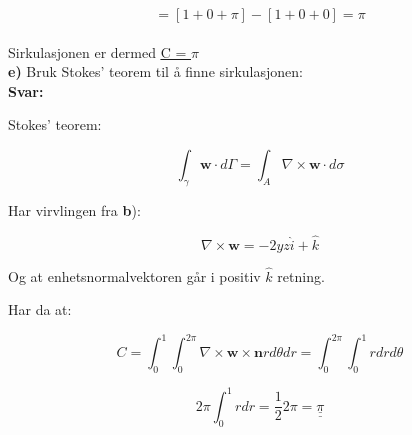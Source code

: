 \documentclass[a4paper,norsk,12pt]{article}
\begin{document}
$$ = [1+0 + \pi] - [1 + 0 + 0] = \pi $$\\


\def\doubleunderline#1{\underline{\underline{#1}}} 
Sirkulasjonen er dermed \doubleunderline{C = $\pi$}
\\

\textbf{e)} Bruk Stokes' teorem til å finne sirkulasjonen:\\

\textbf{Svar:}

Stokes' teorem:

$$
\int_\gamma \textbf{w} \cdot d \Gamma = \int_A \nabla \times \textbf{w} \cdot d \sigma
$$


Har virvlingen fra \textbf{b}):

$$\nabla \times \textbf{w} = {-2yz \hat i + \hat k}$$

Og at enhetsnormalvektoren går i positiv $\hat k $ retning.

Har da at:

$$
C = \int_0^1 \int_0^{2 \pi} \nabla \times \textbf{w} \times \textbf{n} r d \theta dr = \int_0^{2 \pi} \int_0^1 r dr d \theta
$$

$$
2 \pi \int_0^1 r dr = \dfrac{1}{2} 2 \pi = \doubleunderline{\pi}
$$
\end{document}
